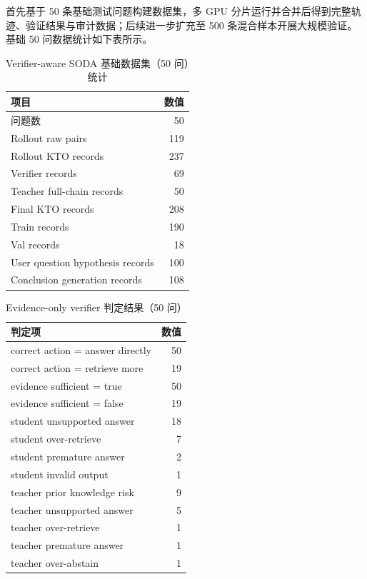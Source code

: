 \documentclass[UTF8,a4paper,12pt]{ctexart}
\begin{document}
首先基于 50 条基础测试问题构建数据集，多 GPU 分片运行并合并后得到完整轨迹、验证结果与审计数据；后续进一步扩充至 500 条混合样本开展大规模验证。基础 50 问数据统计如下表所示。

\begin{table}[htbp]
\centering
\begin{tabular}{lr}
\toprule
项目 & 数值 \\
\midrule
问题数 & 50 \\
Rollout raw pairs & 119 \\
Rollout KTO records & 237 \\
Verifier records & 69 \\
Teacher full-chain records & 50 \\
Final KTO records & 208 \\
Train records & 190 \\
Val records & 18 \\
User question hypothesis records & 100 \\
Conclusion generation records & 108 \\
\bottomrule
\end{tabular}
\caption{Verifier-aware SODA 基础数据集（50 问）统计}
\end{table}

\begin{table}[htbp]
\centering
\begin{tabular}{lr}
\toprule
判定项 & 数值 \\
\midrule
correct action = answer directly & 50 \\
correct action = retrieve more & 19 \\
evidence sufficient = true & 50 \\
evidence sufficient = false & 19 \\
student unsupported answer & 18 \\
student over-retrieve & 7 \\
student premature answer & 2 \\
student invalid output & 1 \\
teacher prior knowledge risk & 9 \\
teacher unsupported answer & 5 \\
teacher over-retrieve & 1 \\
teacher premature answer & 1 \\
teacher over-abstain & 1 \\
\bottomrule
\end{tabular}
\caption{Evidence-only verifier 判定结果（50 问）}
\end{table}
\end{document}
